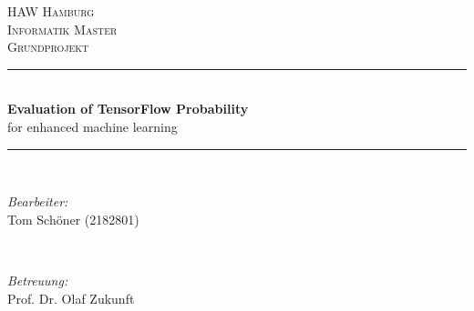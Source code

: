 \documentclass[12pt]{article}
\begin{document}
\begin{titlepage}

\newcommand{\HRule}{\rule{\linewidth}{0.5mm}} %

\begin{center}
 

\textsc{\LARGE HAW Hamburg}\\[0.5cm] %
\textsc{\LARGE Informatik Master}\\[1.5cm] %
\textsc{\Large Grundprojekt}\\[0.5cm] %


\HRule \\[0.4cm]

{ \large \bfseries Evaluation of TensorFlow Probability}\\[0.1cm]
{ \large for enhanced machine learning}\\[0cm]

\HRule \\[2.0cm]


\begin{minipage}{\textwidth}
\begin{flushleft} \large
\emph{Bearbeiter:}\\
Tom Schöner (2182801) \linebreak
\end{flushleft}
\end{minipage}
~
\begin{minipage}{\textwidth}
\begin{flushleft} \large
\emph{Betreuung:} \\
Prof. Dr. Olaf Zukunft
\end{flushleft}
\end{minipage}\\[4cm]


\end{center}
\end{titlepage}
\end{document}
